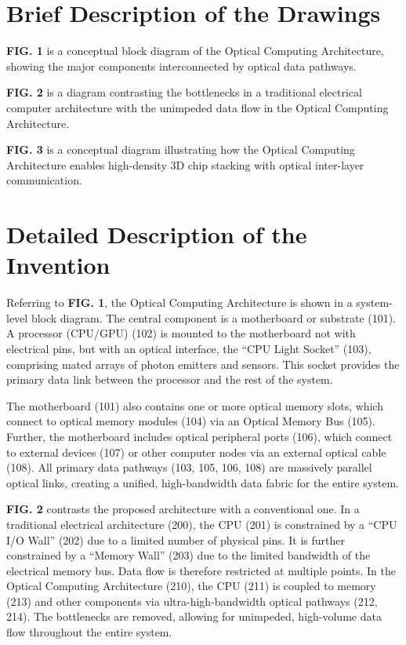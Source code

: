 \documentclass[11pt,letterpaper]{article}
\begin{document}
\section*{Brief Description of the Drawings}
\noindent\textbf{FIG. 1} is a conceptual block diagram of the Optical Computing Architecture, showing the major components interconnected by optical data pathways.

\noindent\textbf{FIG. 2} is a diagram contrasting the bottlenecks in a traditional electrical computer architecture with the unimpeded data flow in the Optical Computing Architecture.

\noindent\textbf{FIG. 3} is a conceptual diagram illustrating how the Optical Computing Architecture enables high-density 3D chip stacking with optical inter-layer communication.

\section*{Detailed Description of the Invention}
Referring to \textbf{FIG. 1}, the Optical Computing Architecture is shown in a system-level block diagram. The central component is a motherboard or substrate (101). A processor (CPU/GPU) (102) is mounted to the motherboard not with electrical pins, but with an optical interface, the ``CPU Light Socket'' (103), comprising mated arrays of photon emitters and sensors. This socket provides the primary data link between the processor and the rest of the system.

The motherboard (101) also contains one or more optical memory slots, which connect to optical memory modules (104) via an Optical Memory Bus (105). Further, the motherboard includes optical peripheral ports (106), which connect to external devices (107) or other computer nodes via an external optical cable (108). All primary data pathways (103, 105, 106, 108) are massively parallel optical links, creating a unified, high-bandwidth data fabric for the entire system.

\textbf{FIG. 2} contrasts the proposed architecture with a conventional one. In a traditional electrical architecture (200), the CPU (201) is constrained by a ``CPU I/O Wall'' (202) due to a limited number of physical pins. It is further constrained by a ``Memory Wall'' (203) due to the limited bandwidth of the electrical memory bus. Data flow is therefore restricted at multiple points. In the Optical Computing Architecture (210), the CPU (211) is coupled to memory (213) and other components via ultra-high-bandwidth optical pathways (212, 214). The bottlenecks are removed, allowing for unimpeded, high-volume data flow throughout the entire system.
\end{document}
